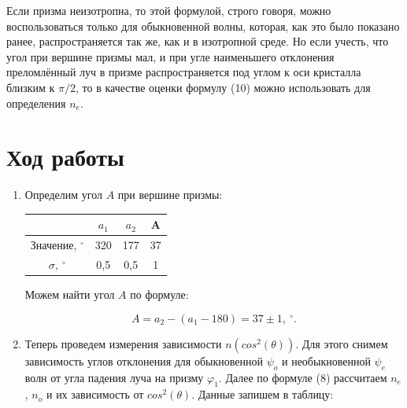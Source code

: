 \documentclass[a4paper, 12pt]{article}%
\begin{document}
Если призма неизотропна, то этой формулой, строго говоря, можно воспользоваться только для обыкновенной волны, которая, как это было показано ранее, распространяется так же, как и в изотропной среде. Но если учесть, что угол при вершине призмы мал, и при угле наименьшего отклонения преломлённый луч в призме распространяется под углом к оси кристалла близким к $\pi / 2$, то в качестве оценки формулу (10) можно использовать для определения $n_e$.

\section*{Ход работы}

\begin{enumerate}

\item Определим угол $A$ при вершине призмы:

\begin{center}
\begin{tabular}{|c|c|c|c|}
\hline 
 & $a_1$ & $a_2$ & A \\ 
\hline 
Значение, $^{\circ}$ & 320 & 177 & 37 \\ 
\hline 
$\sigma, \: ^{\circ}$ & 0,5 & 0,5 & 1 \\ 
\hline 
\end{tabular} 
\end{center}

Можем найти угол $A$ по формуле:

\[A = a_2 - (a_1 - 180) = 37 \pm 1, \: ^{\circ}.\]

\item Теперь проведем измерения зависимости $n(cos^2(\theta))$. Для этого снимем зависимость углов отклонения для обыкновенной $\psi_o$ и необыкновенной $\psi_e$ волн от угла падения луча на призму $\varphi_1$. Далее по формуле (8) рассчитаем $n_e$, $n_o$ и их зависимость от $cos^2(\theta)$. Данные запишем в таблицу:


\end{enumerate}
\end{document}
